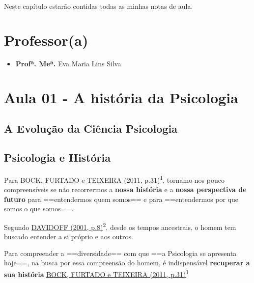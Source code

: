 \documentclass[
]{book}
\providecommand{\tightlist}{%
  \setlength{\itemsep}{0pt}\setlength{\parskip}{0pt}}
\theoremstyle{definition}
\theoremstyle{definition}
\theoremstyle{definition}
\theoremstyle{definition}
\theoremstyle{remark}
\begin{document}
Neste capítulo estarão contidas todas as minhas notas de aula.

\hypertarget{professora-1}{%
\section*{Professor(a)}\label{professora-1}}

\begin{itemize}
\tightlist
\item
  \textbf{Profª. Meª.} Eva Maria Lins Silva
\end{itemize}

\hypertarget{aula-01---a-histuxf3ria-da-psicologia}{%
\section{Aula 01 - A história da Psicologia}\label{aula-01---a-histuxf3ria-da-psicologia}}

\hypertarget{a-evoluuxe7uxe3o-da-ciuxeancia-psicologia}{%
\subsection*{A Evolução da Ciência Psicologia}\label{a-evoluuxe7uxe3o-da-ciuxeancia-psicologia}}

\hypertarget{psicologia-e-histuxf3ria}{%
\subsection{Psicologia e História}\label{psicologia-e-histuxf3ria}}

Para \protect\hyperlink{bibliografia}{BOCK, FURTADO e TEIXEIRA (2011, p.31)}\textsuperscript{1}, tornamo-nos pouco compreensíveis se não recorrermos a \textbf{nossa história} e a \textbf{nossa perspectiva de futuro} para ==entendermos quem somos== e para ==entendermos por que somos o que somos==.

Segundo \protect\hyperlink{bibliografia}{DAVIDOFF (2001, p.8)}\textsuperscript{2}, desde os tempos ancestrais, o homem tem buscado entender a si próprio e aos outros.

Para compreender a ==diversidade== com que ==a Psicologia se apresenta hoje==, na busca por essa compreensão do homem, é indispensável \textbf{recuperar a sua história} \protect\hyperlink{bibliografia}{BOCK, FURTADO e TEIXEIRA (2011, p.31)}\textsuperscript{1}
\end{document}
